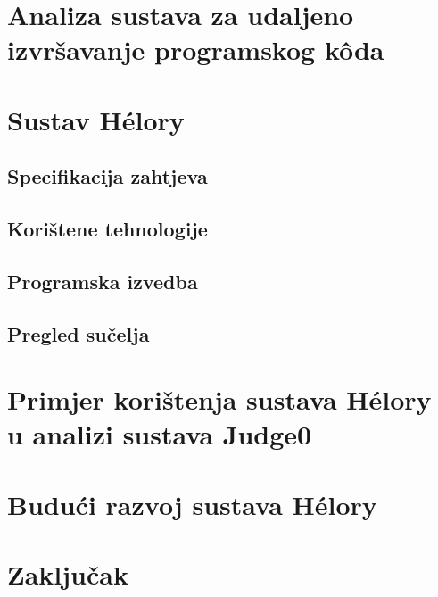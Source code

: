 \documentclass[times, utf8, diplomski]{fer}
\begin{document}
\chapter{Analiza sustava za udaljeno izvršavanje programskog kôda}

\chapter{Sustav Hélory}
\section{Specifikacija zahtjeva}
\section{Korištene tehnologije}
\section{Programska izvedba}
\section{Pregled sučelja}

\chapter{Primjer korištenja sustava Hélory u analizi sustava Judge0}

\chapter{Budući razvoj sustava Hélory}

\chapter{Zaključak}




\begin{sazetak}
\end{sazetak}

\begin{abstract}
\end{abstract}
\end{document}
